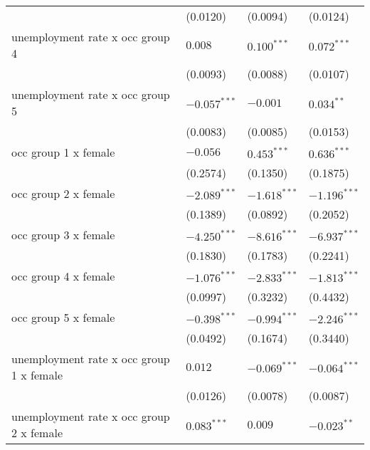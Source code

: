 \begin{tabular}{llll}
                                         &           (0.0120) &           (0.0094) &           (0.0124) \\
unemployment rate x occ group 4          &            $0.008$ &      $0.100^{***}$ &      $0.072^{***}$ \\
                                         &           (0.0093) &           (0.0088) &           (0.0107) \\
unemployment rate x occ group 5          &     $-0.057^{***}$ &           $-0.001$ &       $0.034^{**}$ \\
                                         &           (0.0083) &           (0.0085) &           (0.0153) \\
occ group 1 x female                     &           $-0.056$ &      $0.453^{***}$ &      $0.636^{***}$ \\
                                         &           (0.2574) &           (0.1350) &           (0.1875) \\
occ group 2 x female                     &     $-2.089^{***}$ &     $-1.618^{***}$ &     $-1.196^{***}$ \\
                                         &           (0.1389) &           (0.0892) &           (0.2052) \\
occ group 3 x female                     &     $-4.250^{***}$ &     $-8.616^{***}$ &     $-6.937^{***}$ \\
                                         &           (0.1830) &           (0.1783) &           (0.2241) \\
occ group 4 x female                     &     $-1.076^{***}$ &     $-2.833^{***}$ &     $-1.813^{***}$ \\
                                         &           (0.0997) &           (0.3232) &           (0.4432) \\
occ group 5 x female                     &     $-0.398^{***}$ &     $-0.994^{***}$ &     $-2.246^{***}$ \\
                                         &           (0.0492) &           (0.1674) &           (0.3440) \\
unemployment rate x occ group 1 x female &            $0.012$ &     $-0.069^{***}$ &     $-0.064^{***}$ \\
                                         &           (0.0126) &           (0.0078) &           (0.0087) \\
unemployment rate x occ group 2 x female &      $0.083^{***}$ &            $0.009$ &      $-0.023^{**}$ \\

\end{tabular}
